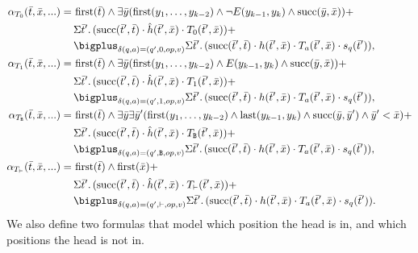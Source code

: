 \begin{align*}
\alpha_{T_0}(\bar{t},\bar{x},...) = \,&\first(\bar{t}) \wedge \exists\bar{y}(\first(y_1,\ldots,y_{k-2})\wedge\neg E(y_{k-1},y_k) \wedge \successor(\bar{y},\bar{x}) )+ \\
&\sa{\bar{t}'}(\successor(\bar{t}',\bar{t}) \mult \hat{h}(\bar{t}',\bar{x}) \mult T_0(\bar{t}',\bar{x})) + \\
&\bigplus_{\delta(q,a) = (q',0,op,v)}\sa{\bar{t}'}(\successor(\bar{t}',\bar{t}) \mult h(\bar{t}',\bar{x}) \mult T_a(\bar{t}',\bar{x}) \mult s_{q}(\bar{t}')),\\
\alpha_{T_1}(\bar{t},\bar{x},...) = \,&\first(\bar{t}) \wedge \exists\bar{y}(\first(y_1,\ldots,y_{k-2})\wedge E(y_{k-1},y_k) \wedge \successor(\bar{y},\bar{x}) )+ \\
&\sa{\bar{t}'}(\successor(\bar{t}',\bar{t}) \mult \hat{h}(\bar{t}',\bar{x}) \mult T_1(\bar{t}',\bar{x})) + \\
&\bigplus_{\delta(q,a) = (q',1,op,v)}\sa{\bar{t}'}(\successor(\bar{t}',\bar{t}) \mult h(\bar{t}',\bar{x}) \mult T_a(\bar{t}',\bar{x}) \mult s_{q}(\bar{t}')),\\
\alpha_{T_{\ttB}}(\bar{t},\bar{x},...) = \,&\first(\bar{t})\wedge\exists\bar{y}\exists\bar{y}'(\first(y_1,\ldots,y_{k-2})\wedge\last(y_{k-1},y_k)\wedge\successor(\bar{y},\bar{y}')\wedge\bar{y}' < \bar{x}) + \\
&\sa{\bar{t}'}(\successor(\bar{t}',\bar{t}) \mult \hat{h}(\bar{t}',\bar{x}) \mult T_{\ttB}(\bar{t}',\bar{x})) + \\
&\bigplus_{\delta(q,a) = (q',{\ttB},op,v)}\sa{\bar{t}'}(\successor(\bar{t}',\bar{t}) \mult h(\bar{t}',\bar{x}) \mult T_a(\bar{t}',\bar{x}) \mult s_{q}(\bar{t}')),\\
\alpha_{T_{\vdash}}(\bar{t},\bar{x},...) = \,&\first(\bar{t}) \wedge \first(\bar{x}) + \\
&\sa{\bar{t}'}(\successor(\bar{t}',\bar{t}) \mult \hat{h}(\bar{t}',\bar{x}) \mult T_{\vdash}(\bar{t}',\bar{x})) + \\
&\bigplus_{\delta(q,a) = (q',\vdash,op,v)}\sa{\bar{t}'}(\successor(\bar{t}',\bar{t}) \mult h(\bar{t}',\bar{x}) \mult T_a(\bar{t}',\bar{x}) \mult s_{q}(\bar{t}')).
\end{align*}
We also define two formulas that model which position the head is in, and which positions the head is not in.
